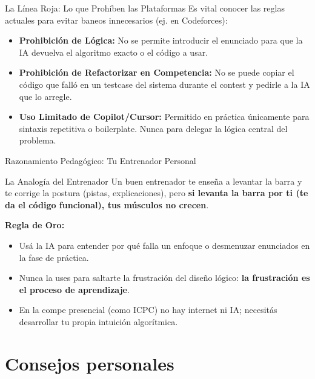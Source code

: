 \documentclass{beamer}
\begin{document}
\begin{frame}{La Línea Roja: Lo que Prohíben las Plataformas}
  Es vital conocer las reglas actuales para evitar baneos innecesarios (ej. en Codeforces):
  
  \vspace{0.2cm}
  \begin{itemize}
    \item \textbf{Prohibición de Lógica:} No se permite introducir el enunciado para que la IA devuelva el algoritmo exacto o el código a usar.
    \item \textbf{Prohibición de Refactorizar en Competencia:} No se puede copiar el código que falló en un testcase del sistema durante el contest y pedirle a la IA que lo arregle.
    \item \textbf{Uso Limitado de Copilot/Cursor:} Permitido en práctica únicamente para sintaxis repetitiva o boilerplate. Nunca para delegar la lógica central del problema.
  \end{itemize}
\end{frame}

\begin{frame}{Razonamiento Pedagógico: Tu Entrenador Personal}
  \begin{block}{La Analogía del Entrenador}
    Un buen entrenador te enseña a levantar la barra y te corrige la postura (pistas, explicaciones), pero \textbf{si levanta la barra por ti (te da el código funcional), tus músculos no crecen}.
  \end{block}
  
  \vspace{0.2cm}
  \textbf{Regla de Oro:}
  \begin{itemize}
    \item Usá la IA para entender por qué falla un enfoque o desmenuzar enunciados en la fase de práctica.
    \item Nunca la uses para saltarte la frustración del diseño lógico: \textbf{la frustración es el proceso de aprendizaje}.
    \item En la compe presencial (como ICPC) no hay internet ni IA; necesitás desarrollar tu propia intuición algorítmica.
  \end{itemize}
\end{frame}

\section{Consejos personales}
\end{document}
